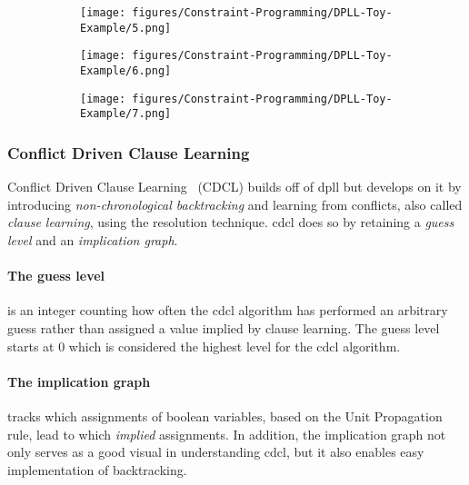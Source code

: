 \begin{figure}[H]
    \centering
    \begin{subfigure}[t]{0.45\textwidth}
        \centering
        \texttt{[image: figures/Constraint-Programming/DPLL-Toy-Example/5.png]}
    \end{subfigure}
    \begin{subfigure}[t]{0.45\textwidth}
        \centering
        \texttt{[image: figures/Constraint-Programming/DPLL-Toy-Example/6.png]}
    \end{subfigure}
\end{figure}
\begin{figure}[H]
    \centering
    \begin{subfigure}[t]{0.45\textwidth}
        \centering
        \texttt{[image: figures/Constraint-Programming/DPLL-Toy-Example/7.png]}
    \end{subfigure}
\end{figure}

\subsubsection{Conflict Driven Clause Learning}\label{sec:CDCL}
Conflict Driven Clause Learning~\cite{CDCL-1, CDCL-2, CDCL-3} (CDCL) builds off of \acrshort{dpll} but develops on it by introducing \textit{non-chronological backtracking} and learning from conflicts, also called \textit{clause learning},  using the resolution technique. \acrshort{cdcl} does so by retaining a \emph{guess level} and an \emph{implication graph}.
\paragraph{The guess level} is an integer counting how often the \acrshort{cdcl} algorithm has performed an arbitrary guess rather than assigned a value implied by clause learning. The guess level starts at \(0\) which is considered the highest level for the \acrshort{cdcl} algorithm.
\paragraph{The implication graph} tracks which assignments of boolean variables, based on the Unit Propagation rule, lead to which \emph{implied} assignments. In addition, the implication graph not only serves as a good visual in understanding \acrshort{cdcl}, but it also enables easy implementation of backtracking.

